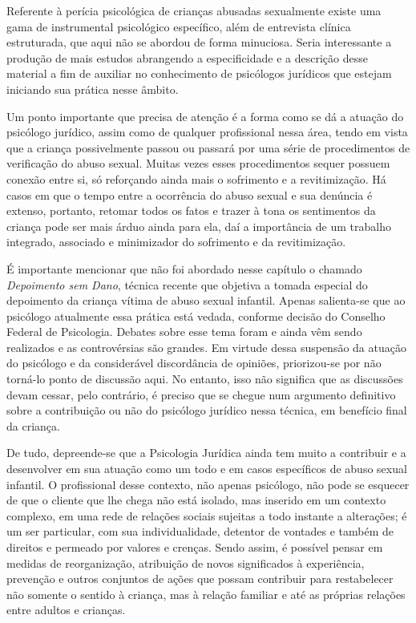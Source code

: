 Referente à perícia psicológica de crianças abusadas sexualmente existe uma gama de instrumental psicológico específico, além de entrevista clínica estruturada, que aqui não se abordou de forma minuciosa. Seria interessante a produção de mais estudos abrangendo a especificidade e a descrição desse material a fim de auxiliar no conhecimento de psicólogos jurídicos que estejam iniciando sua prática nesse âmbito.

Um ponto importante que precisa de atenção é a forma como se dá a atuação do psicólogo jurídico, assim como de qualquer profissional nessa área, tendo em vista que a criança possivelmente passou ou passará por uma série de procedimentos de verificação do abuso sexual. Muitas vezes esses procedimentos sequer possuem conexão entre si, só reforçando ainda mais o sofrimento e a revitimização. Há casos em que o tempo entre a ocorrência do abuso sexual e sua denúncia é extenso, portanto, retomar todos os fatos e trazer à tona os sentimentos da criança pode ser mais árduo ainda para ela, daí a importância de um trabalho integrado, associado e minimizador do sofrimento e da revitimização.

É importante mencionar que não foi abordado nesse capítulo o chamado \emph{Depoimento sem Dano}, técnica recente que objetiva a tomada especial do depoimento da criança vítima de abuso sexual infantil. Apenas salienta-se que ao psicólogo atualmente essa prática está vedada, conforme decisão do Conselho Federal de Psicologia. Debates sobre esse tema foram e ainda vêm sendo realizados e as controvérsias são grandes. Em virtude dessa suspensão da atuação do psicólogo e da considerável discordância de opiniões, priorizou-se por não torná-lo ponto de discussão aqui. No entanto, isso não significa que as discussões devam cessar, pelo contrário, é preciso que se chegue num argumento definitivo sobre a contribuição ou não do psicólogo jurídico nessa técnica, em benefício final da criança.

De tudo, depreende-se que a Psicologia Jurídica ainda tem muito a contribuir e a desenvolver em sua atuação como um todo e em casos específicos de abuso sexual infantil. O profissional desse contexto, não apenas psicólogo, não pode se esquecer de que o cliente que lhe chega não está isolado, mas inserido em um contexto complexo, em uma rede de relações sociais sujeitas a todo instante a alterações; é um ser particular, com sua individualidade, detentor de vontades e também de direitos e permeado por valores e crenças. Sendo assim, é possível pensar em medidas de reorganização, atribuição de novos significados à experiência, prevenção e outros conjuntos de ações que possam contribuir para restabelecer não somente o sentido à criança, mas à relação familiar e até as próprias relações entre adultos e crianças.